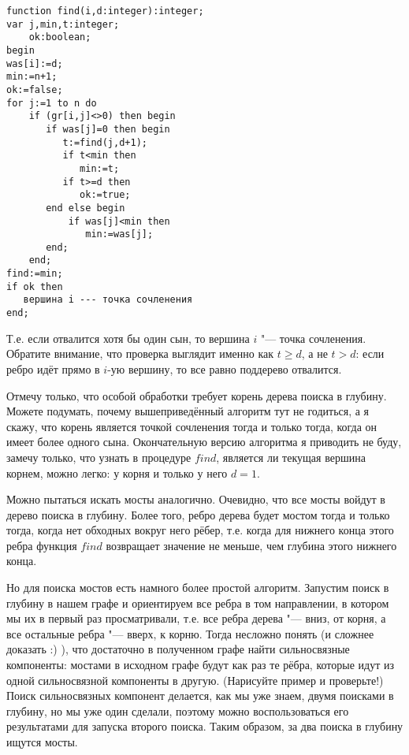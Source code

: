 \begin{codesample}\begin{verbatim}
function find(i,d:integer):integer;
var j,min,t:integer;
    ok:boolean;
begin
was[i]:=d;
min:=n+1;
ok:=false;
for j:=1 to n do
    if (gr[i,j]<>0) then begin
       if was[j]=0 then begin
          t:=find(j,d+1);
          if t<min then
             min:=t;
          if t>=d then
             ok:=true;
       end else begin
           if was[j]<min then
              min:=was[j];
       end;
    end;
find:=min;
if ok then
   вершина i --- точка сочленения
end;
\end{verbatim}\end{codesample}
Т.е. если отвалится хотя бы один сын, то вершина $i$ "--- точка сочленения. Обратите внимание, что проверка выглядит
именно как $t\geq d$, а не $t>d$: если ребро идёт прямо в $i$-ую вершину, то все равно поддерево отвалится.

Отмечу только, что особой обработки требует корень дерева поиска в глубину. Можете подумать, почему вышеприведённый 
алгоритм тут не годиться, а я скажу, что корень является точкой сочленения тогда и только тогда, когда он
имеет более одного сына. Окончательную версию алгоритма я приводить не буду, замечу только, что узнать в
процедуре $find$, является ли текущая вершина корнем, можно легко: у корня и только у него $d=1$.

 Можно пытаться искать мосты аналогично. Очевидно, что все мосты войдут в дерево поиска в глубину.
Более того, ребро дерева будет мостом тогда и только тогда, когда нет обходных вокруг него рёбер, т.е. когда для
нижнего конца этого ребра функция $find$ возвращает значение не меньше, чем глубина этого нижнего конца.


Но для поиска мостов есть намного более простой алгоритм. Запустим поиск в глубину в нашем графе и ориентируем 
все ребра в том направлении, в котором мы их в первый раз просматривали, т.е. все ребра дерева "---
вниз, от корня, а все остальные ребра "--- вверх, к корню. Тогда несложно понять (и сложнее доказать :) ),
что достаточно в полученном графе найти сильносвязные компоненты: мостами в исходном графе будут как раз те рёбра,
которые идут из одной сильносвязной компоненты в другую. (Нарисуйте пример и проверьте!) Поиск сильносвязных компонент
делается, как мы уже знаем, двумя поисками в глубину, но мы уже один сделали, поэтому можно воспользоваться
его результатами для запуска второго поиска. Таким образом, за два поиска в глубину ищутся мосты.


